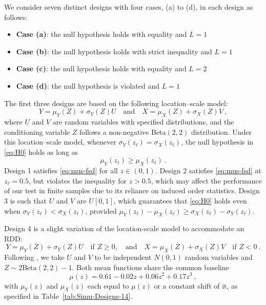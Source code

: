 \documentclass[11pt]{article}
\numberwithin{equation}{section}
\begin{document}
We consider seven distinct designs with four cases, (a) to (d), in each design as follows: 
\begin{itemize}
    \item {\bf Case (a)}: the null hypothesis holds with equality and $L=1$
    \item {\bf Case (b)}: the null hypothesis holds with strict inequality and $L=1$
    \item {\bf Case (c)}: the null hypothesis holds with equality and $L=2$
    \item {\bf Case (d)}: the null hypothesis is violated and $L=1$
\end{itemize}

The first three designs are based on the following location–scale model:
\begin{equation}\label{eq:loc-scale}
Y = \mu_Y(Z) + \sigma_Y(Z) U \quad \text{and} \quad X = \mu_X(Z) + \sigma_X(Z) V~,
\end{equation}
where $U$ and $V$ are random variables with specified distributions, and the conditioning variable $Z$ follows a non-negative Beta$(2,2)$ distribution. Under this location–scale model, whenever $\sigma_Y(z_{\ell}) = \sigma_X(z_{\ell})$, the null hypothesis in \eqref{eq:H0} holds as long as
\begin{equation}\label{eq:mus-fsd}
    \mu_Y(z_{\ell}) \ge \mu_X(z_{\ell})~.
\end{equation}
Design 1 satisfies \eqref{eq:mus-fsd} for all $z\in(0,1)$. Design 2 satisfies \eqref{eq:mus-fsd} at $z_{\ell} = 0.5$, but violates the inequality for $z > 0.5$, which may affect the performance of our test in finite samples due to its reliance on induced order statistics. Design 3 is such that $U$ and $V$ are $U[0,1]$, which guarantees that \eqref{eq:H0} holds even when $\sigma_Y(z_{\ell}) < \sigma_X(z_{\ell})$, provided $\mu_Y(z_{\ell}) - \mu_X(z_{\ell}) \ge \sigma_X(z_{\ell}) - \sigma_Y(z_{\ell})$. 

Design 4 is a slight variation of the location-scale model to accommodate an RDD: 
\begin{equation}\label{eq:rdd-design}
Y = \mu_Y(Z) + \sigma_Y(Z) U \quad \text{if } Z \geq 0, \quad \text{and} \quad X = \mu_X(Z) + \sigma_X(Z) V \quad \text{if } Z < 0~.
\end{equation}
Following \cite{shen/zhang:16}, we take $U$ and $V$ to be independent $N(0,1)$ random variables and $Z \sim 2\mathrm{Beta}(2,2)-1$. Both mean functions share the common baseline
\begin{equation}\label{eq:SZ-mu}
\mu(z) = 0.61 - 0.02 z + 0.06 z^{2} + 0.17 z^{3}~,
\end{equation}
with $\mu_Y(z)$ and $\mu_X(z)$ each equal to $\mu(z)$ or a constant shift of it, as specified in Table~\ref{tab:Simu-Designs-14}.
\end{document}

